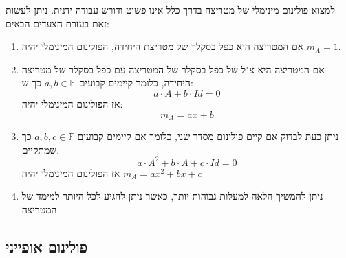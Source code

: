 \documentclass{tstextbook}
\begin{document}
\begin{remark}
למצוא פולינום מינימלי של מטריצה בדרך כלל אינו פשוט ודורש עבודה ידנית. ניתן לעשות זאת בעזרת הצעדים הבאים:

  \begin{enumerate}
    \item אם המטריצה היא כפל בסקלר של מטריצת היחידה, הפולינום המינימלי יהיה \(m_{A}=1\). 


    \item אם המטריצה היא צ"ל של כפל בסקלר של המטריצה עם כפל בסקלר של מטריצה היחידה, כלומר קיימים קבועים \(a,b \in \mathbb{F}\) כך ש: 
$$a\cdot A+b\cdot Id = 0$$
אז הפולינום המינימלי יהיה:
$$m_{A}=ax+b$$


    \item ניתן כעת לבדוק אם קיים פולינום מסדר שני, כלומר אם קיימים קבועים \(a,b,c \in \mathbb{F}\) כך שמתקיים: 
$$a\cdot A^{2}+b\cdot A+ c\cdot Id = 0$$
אז הפולינום המינימלי יהיה \(m_{A}=ax^{2}+bx+c\)


    \item ניתן להמשיך הלאה למעלות גבוהות יותר, כאשר ניתן להגיע לכל היותר למימד של המטריצה. 


  \end{enumerate}
\end{remark}
\subsection{פולינום אופייני}
\end{document}
